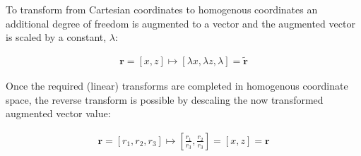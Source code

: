 %
To transform from Cartesian coordinates to \gls{homogenous coordinates} an additional degree of freedom is augmented to a vector and the augmented vector is scaled by a constant, \(\lambda \):

\begin{align}
\textbf{r} = [x,z] \mapsto  [\lambda x, \lambda z, \lambda] = \widetilde{\textbf{r}} \label{eq:cart2homo}
\end{align}

Once the required (linear) transforms are completed in \gls{homogenous coordinate} space, the reverse transform is possible by descaling the now transformed augmented vector value:

\begin{align}
{\textbf{r}} =[r_1,r_2,r_3] \mapsto \left[\frac{r_1}{r_3},\frac{r_2}{r_3}\right] = [x,z] = \textbf{r} \label{eq:homo2cart} %
\end{align}

